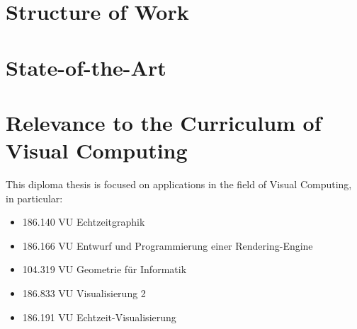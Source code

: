 \documentclass[]{article}
\begin{document}
\section{Structure of Work}

\section{State-of-the-Art}

\section{Relevance to the Curriculum of Visual Computing}

This diploma thesis is focused on applications in the field of Visual Computing, in particular: 

\begin{itemize}
	\item 186.140 VU Echtzeitgraphik
	\item 186.166 VU Entwurf und Programmierung einer Rendering-Engine
	\item 104.319 VU Geometrie für Informatik
	\item 186.833 VU Visualisierung 2
	\item 186.191 VU Echtzeit-Visualisierung
\end{itemize}



\end{document}
